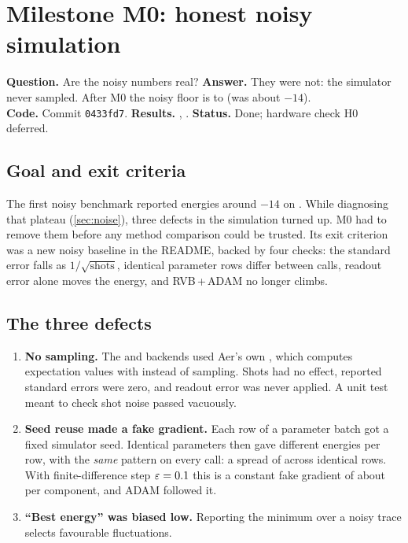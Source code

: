 \section{Milestone M0: honest noisy simulation}
\label{sec:m0}

\begin{tcolorbox}[colback=gray!5, colframe=gray!40, title={M0 at a glance}, fonttitle=\bfseries]
  \textbf{Question.} Are the noisy numbers real?\quad
  \textbf{Answer.} They were not: the simulator never sampled. After M0 the noisy floor is
  \VPostFinalMin{} to \VPostFinalMax{} (was about $-14$).\\
  \textbf{Code.} Commit \texttt{0433fd7}. \textbf{Results.} ,
  . \textbf{Status.} Done; hardware check H0 deferred.
\end{tcolorbox}

\subsection{Goal and exit criteria}

The first noisy benchmark reported energies around $-14$ on . While
diagnosing that plateau (\cref{sec:noise}), three defects in the simulation turned up. M0 had to
remove them before any method comparison could be trusted. Its exit criterion was a new noisy
baseline in the README, backed by four checks: the standard error falls as $1/\sqrt{\text{shots}}$,
identical parameter rows differ between calls, readout error alone moves the energy, and
RVB\,+\,ADAM no longer climbs.

\subsection{The three defects}

\begin{enumerate}
  \item \textbf{No sampling.} The  and  backends used Aer's own
    , which computes expectation values with 
    instead of sampling. Shots had no effect, reported standard errors were zero, and readout
    error was never applied. A unit test meant to check shot noise passed vacuously.
  \item \textbf{Seed reuse made a fake gradient.} Each row of a parameter batch got a fixed
    simulator seed. Identical parameters then gave different energies per row, with the
    \emph{same} pattern on every call: a spread of \VSeedBugSpread{} across \VSeedBugRows{}
    identical rows. With finite-difference step $\varepsilon=0.1$ this is a constant fake
    gradient of about \VSeedBugGrad{} per component, and ADAM followed it.
  \item \textbf{``Best energy'' was biased low.} Reporting the minimum over a noisy trace
    selects favourable fluctuations.
\end{enumerate}

